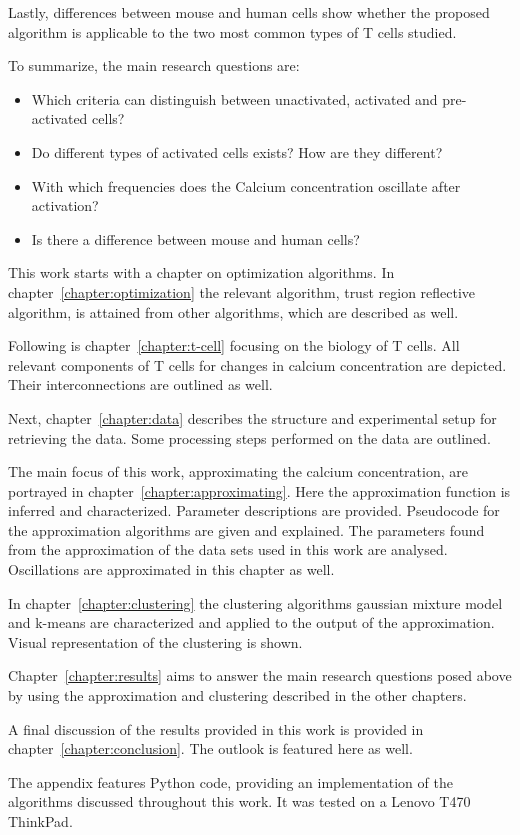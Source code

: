 Lastly, differences between mouse and human cells show whether the proposed algorithm is applicable to the two most common types of T cells studied.

To summarize, the main research questions are:
\begin{itemize}
	\item Which criteria can distinguish between unactivated, activated and pre-activated cells?
	\item Do different types of activated cells exists? How are they different?
	\item With which frequencies does the Calcium concentration oscillate after activation?
	\item Is there a difference between mouse and human cells?
\end{itemize}

\newpage
\noindent
This work starts with a chapter on optimization algorithms. In chapter~\ref{chapter:optimization} the relevant algorithm, trust region reflective algorithm, is attained from other algorithms, which are described as well.

Following is chapter~\ref{chapter:t-cell} focusing on the biology of T cells. All relevant components of T cells for changes in calcium concentration are depicted. Their interconnections are outlined as well.

Next, chapter~\ref{chapter:data} describes the structure and experimental setup for retrieving the data. Some processing steps performed on the data are outlined.

The main focus of this work, approximating the calcium concentration, are portrayed in chapter~\ref{chapter:approximating}. Here the approximation function is inferred and characterized. Parameter descriptions are provided. Pseudocode for the approximation algorithms are given and explained. The parameters found from the approximation of the data sets used in this work are analysed. Oscillations are approximated in this chapter as well.

In chapter~\ref{chapter:clustering} the clustering algorithms gaussian mixture model and k-means are characterized and applied to the output of the approximation. Visual representation of the clustering is shown.

Chapter~\ref{chapter:results} aims to answer the main research questions posed above by using the approximation and clustering described in the other chapters.

A final discussion of the results provided in this work is provided in chapter~\ref{chapter:conclusion}. The outlook is featured here as well.

The appendix features Python code, providing an implementation of the algorithms discussed throughout this work. It was tested on a Lenovo T470 ThinkPad.
